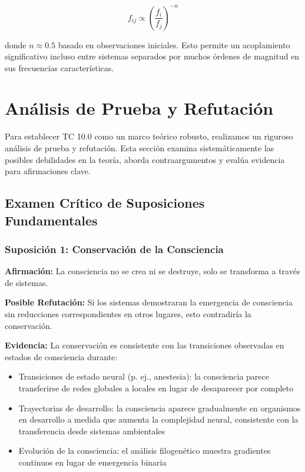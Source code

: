 \documentclass[12pt]{article}
\begin{document}
\begin{equation}
f_{ij} \propto \left(\frac{f_i}{f_j}\right)^{-n}
\end{equation}

donde $n \approx 0.5$ basado en observaciones iniciales. Esto permite un acoplamiento significativo incluso entre sistemas separados por muchos órdenes de magnitud en sus frecuencias características.

\section{Análisis de Prueba y Refutación}

Para establecer TC 10.0 como un marco teórico robusto, realizamos un riguroso análisis de prueba y refutación. Esta sección examina sistemáticamente las posibles debilidades en la teoría, aborda contraargumentos y evalúa evidencia para afirmaciones clave.

\subsection{Examen Crítico de Suposiciones Fundamentales}

\subsubsection{Suposición 1: Conservación de la Consciencia}

\textbf{Afirmación:} La consciencia no se crea ni se destruye, solo se transforma a través de sistemas.

\textbf{Posible Refutación:} Si los sistemas demostraran la emergencia de consciencia sin reducciones correspondientes en otros lugares, esto contradiría la conservación.

\textbf{Evidencia:} La conservación es consistente con las transiciones observadas en estados de consciencia durante:

\begin{itemize}
    \item Transiciones de estado neural (p. ej., anestesia): la consciencia parece transferirse de redes globales a locales en lugar de desaparecer por completo \cite{kelz2019}
    \item Trayectorias de desarrollo: la consciencia aparece gradualmente en organismos en desarrollo a medida que aumenta la complejidad neural, consistente con la transferencia desde sistemas ambientales
    \item Evolución de la consciencia: el análisis filogenético muestra gradientes continuos en lugar de emergencia binaria \cite{birch2020}
\end{itemize}
\end{document}

